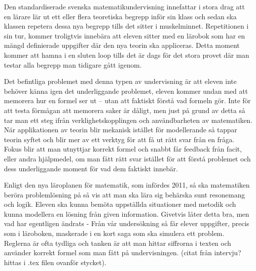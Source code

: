\textcolor{WildStrawberry}{
    Den standardiserade svenska matematikundervisning innefattar i stora drag att en lärare lär ut ett eller flera teoretiska begrepp inför sin klass och sedan ska klassen repetera dessa nya begrepp tills det sitter i muskelminnet. Repetitionen i sin tur, kommer troligtvis innebära att eleven sitter med en lärobok som har en mängd definierade uppgifter där den nya teorin ska appliceras. Detta moment kommer att hamna i en sluten loop tills det är dags för det stora provet där man testar alla begrepp man tidigare gått igenom.
}

\textcolor{WildStrawberry}{
    Det befintliga problemet med denna typen av undervisning är att eleven inte behöver känna igen det underliggande problemet, eleven kommer undan med att memorera hur en formel ser ut – utan att faktiskt förstå vad formeln gör. Inte för att testa förmågan att memorera saker är dåligt, men just på grund av detta så tar man ett steg ifrån verklighetskopplingen och användbarheten av matematiken. När applikationen av teorin blir mekanisk istället för modellerande så tappar teorin syftet och blir mer av ett verktyg för att få ut rätt svar från en fråga. Fokus blir att man utnyttjar korrekt formel och snabbt får feedback från facit, eller andra hjälpmedel, om man fått rätt svar istället för att förstå problemet och dess underliggande moment för vad dem faktiskt innebär.
}



\textcolor{WildStrawberry}{
    Enligt den nya läroplanen för matematik, som infördes 2011, så ska matematiken beröra problemlösning på så vis att man ska lära sig behärska sunt resonemang och logik. Eleven ska kunna bemöta uppställda situationer med metodik och kunna modellera en lösning från given information. Givetvis låter detta bra, men vad har egentligen ändrats - Från vår undersökning så får elever uppgifter, precis som i läroboken, maskerade i en kort saga som ska simulera ett problem. Reglerna är ofta tydliga och tanken är att man hittar siffrorna i texten och använder korrekt formel som man fått på undervisningen. (citat från intervju? hittas i .tex filen ovanför stycket).
}

